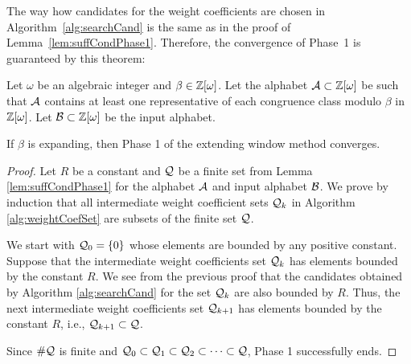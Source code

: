 The way how candidates for the weight coefficients are chosen in Algorithm~\ref{alg:searchCand} is the same as in the proof of Lemma~\ref{lem:suffCondPhase1}. Therefore, the convergence of Phase~1 is guaranteed by this theorem:
\begin{thm}
\label{thm:suffCondPhase1}
Let $\omega$ be an algebraic integer and $\beta\in\mathbb{Z}[\omega]$. Let the alphabet $\mathcal{A}\subset\mathbb{Z}[\omega]$ be such that $\mathcal{A}$ contains at least one representative of each congruence class modulo $\beta$ in $\mathbb{Z}[\omega]$. Let $\mathcal{B}\subset\mathbb{Z}[\omega]$ be the input alphabet. 

If $\beta$ is expanding, then Phase 1 of the extending window method converges.
\end{thm}
\begin{proof}
Let $R$ be a constant and $\mathcal{Q}$ be a finite set from Lemma \ref{lem:suffCondPhase1} for the alphabet $\mathcal{A}$ and input alphabet $\mathcal{B}$. We prove by induction that  all intermediate weight coefficient sets $\mathcal{Q}_k$ in Algorithm \ref{alg:weightCoefSet} are subsets of the finite set $\mathcal{Q}$. 

We start with $\mathcal{Q}_0=\{0\}$ whose elements are bounded by any positive constant. Suppose that the intermediate weight coefficients set $\mathcal{Q}_k$ has elements bounded by the constant $R$. We see from the previous  proof that the candidates obtained by Algorithm \ref{alg:searchCand} for the set $\mathcal{Q}_k$ are also bounded by $R$. Thus, the next intermediate weight coefficients set $\mathcal{Q}_{k+1}$ has elements bounded by the constant $R$, i.e., $\mathcal{Q}_{k+1}\subset\mathcal{Q}$. 

Since $\#\mathcal{Q}$ is finite and $\mathcal{Q}_0\subset\mathcal{Q}_1\subset\mathcal{Q}_2\subset\cdots\subset\mathcal{Q}$,  Phase 1 successfully ends. 
\end{proof}

